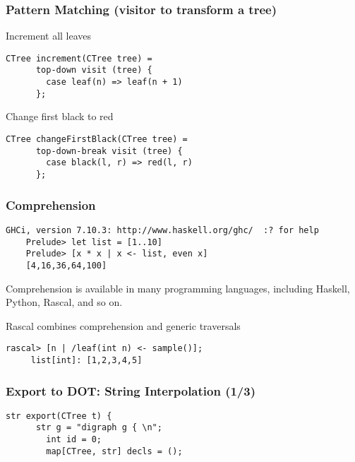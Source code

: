 \documentclass{beamer}
\begin{document}
\begin{frame}[fragile]
  \frametitle{Pattern Matching (visitor to transform a tree)}

  \begin{block}{Increment all leaves}
    \begin{lstlisting}[language=Rascal]
    CTree increment(CTree tree) =
      top-down visit (tree) {
        case leaf(n) => leaf(n + 1)
      };
    \end{lstlisting}  
  \end{block}\pause

  \begin{block}{Change first black to red}
    \begin{lstlisting}[language=Rascal]
    CTree changeFirstBlack(CTree tree) =
      top-down-break visit (tree) {
        case black(l, r) => red(l, r)
      };
    \end{lstlisting}  
  \end{block}\pause

\end{frame}


\begin{frame}[fragile]
  \frametitle{Comprehension}

  \begin{lstlisting}[language=Rascal]
    GHCi, version 7.10.3: http://www.haskell.org/ghc/  :? for help
    Prelude> let list = [1..10]
    Prelude> [x * x | x <- list, even x]
    [4,16,36,64,100]    
  \end{lstlisting}
  
  Comprehension is available in many programming languages\pause,
  including Haskell, Python, Rascal, and so on.

  \begin{block}{Rascal combines comprehension and generic traversals}
   \begin{lstlisting}[language=Rascal]
     rascal> [n | /leaf(int n) <- sample()];
     list[int]: [1,2,3,4,5]
   \end{lstlisting}
  \end{block}
  
\end{frame}

\begin{frame}[fragile]
  \frametitle{Export to DOT: String Interpolation (1/3)}

    \begin{lstlisting}[language=Rascal]
    str export(CTree t) {
      str g = "digraph g { \n";
        int id = 0;
        map[CTree, str] decls = ();
\end{lstlisting}

\end{frame}
\end{document}
